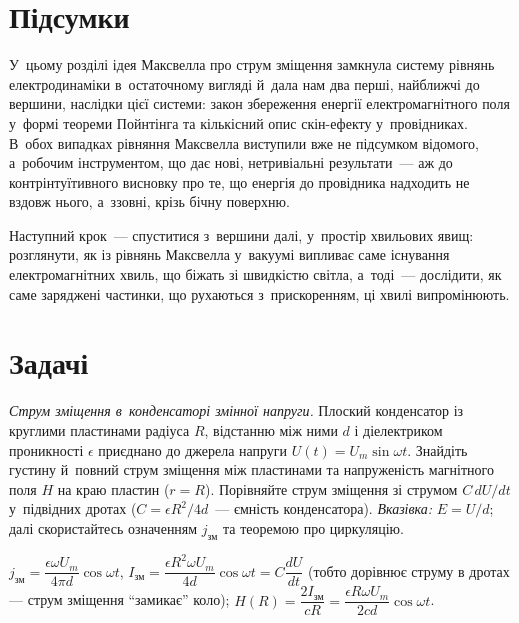 \section*{Підсумки}


 {}

У~цьому розділі ідея Максвелла про струм зміщення замкнула систему рівнянь електродинаміки
в~остаточному вигляді й~дала нам два перші, найближчі до вершини, наслідки цієї системи:
закон збереження енергії електромагнітного поля у~формі теореми Пойнтінга та кількісний
опис скін-ефекту у~провідниках. В~обох випадках рівняння Максвелла виступили вже не
підсумком відомого, а~робочим інструментом, що дає нові, нетривіальні результати~--- аж до
контрінтуїтивного висновку про те, що енергія до провідника надходить не вздовж нього,
а~ззовні, крізь бічну поверхню.

Наступний крок~--- спуститися з~вершини далі, у~простір хвильових явищ: розглянути, як із
рівнянь Максвелла у~вакуумі випливає саме існування електромагнітних хвиль, що біжать зі
швидкістю світла, а~тоді~--- дослідити, як саме заряджені частинки, що рухаються
з~прискоренням, ці хвилі випромінюють.


\section*{Задачі}


 {}


\begin{problem}\label{prb:CapacitorDisplacementAC}
	\emph{Струм зміщення в~конденсаторі змінної напруги.} Плоский конденсатор із круглими
	пластинами радіуса $R$, відстанню між ними $d$ і діелектриком проникності $\epsilon$
	приєднано до джерела напруги $U(t)=U_m\sin\omega t$. Знайдіть густину й~повний струм
	зміщення між пластинами та напруженість магнітного поля $H$ на краю пластин ($r=R$).
	Порівняйте струм зміщення зі струмом $C\,dU/dt$ у~підвідних дротах ($C=\epsilon
	R^2/4d$~--- ємність конденсатора). \emph{Вказівка:} $E=U/d$; далі скористайтесь
	означенням $j_\text{зм}$ та теоремою про циркуляцію.
	\begin{solution}
		$j_\text{зм}=\dfrac{\epsilon\omega U_m}{4\pi d}\cos\omega t$,
		$I_\text{зм}=\dfrac{\epsilon R^2\omega U_m}{4d}\cos\omega t = C\dfrac{dU}{dt}$ (тобто дорівнює струму в дротах --- струм зміщення \enquote{замикає} коло);
		$H(R)=\dfrac{2I_\text{зм}}{cR}=\dfrac{\epsilon R\omega U_m}{2cd}\cos\omega t$.
	\end{solution}
\end{problem}

